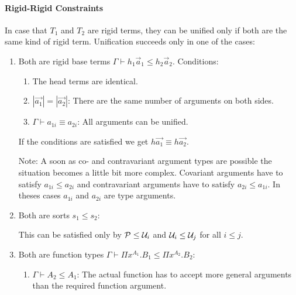 \paragraph{Rigid-Rigid Constraints}
In case that $T_1$ and $T_2$ are rigid terms, they can be unified only if both are
the same kind of rigid term. Unification succeeds only in one of the cases:

\begin{enumerate}
    \item Both are rigid base terms $\Gamma \vdash h_1 \vec a_1 \le h_2 \vec a_2$.
        Conditions:

        \begin{enumerate}
            \item The head terms are identical.

            \item $|\vec {a_1}| = |\vec {a_2}|$: There are the same number of
                arguments on both sides.

            \item $\Gamma \vdash a_{1i} \equiv a_{2i}$: All arguments can be
                unified.
        \end{enumerate}

        If the conditions are satisfied we get $h \vec {a_1} \equiv h \vec {a_2}$.

        Note: A soon as co- and contravariant argument types are possible the
        situation becomes a little bit more complex. Covariant arguments have to
        satisfy $a_{1i} \le a_{2i}$ and contravariant arguments have to satisfy
        $a_{2i} \le a_{1i}$. In theses cases $a_{1i}$ and $a_{2i}$ are type
        arguments.

    \item Both are sorts $s_1 \le s_2 $:

        This can be satisfied only by
        ${\mathcal P} \le {\mathcal U}_i$
        and
        ${\mathcal U}_i \le {\mathcal U}_j$ for all $i \le j$.

    \item Both are function types
        $\Gamma \vdash \Pi x^{A_1}. B_1
                       \le
                       \Pi x^{A_2}. B_2$:

        \begin{enumerate}
            \item $\Gamma \vdash A_2 \le A_1$: The actual function has
                to accept more general arguments than the required
                function argument.


\end{enumerate}
\end{enumerate}
